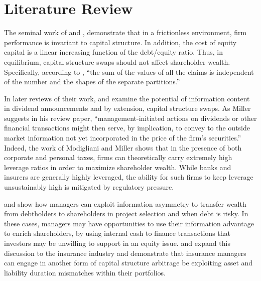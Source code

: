 \section{Literature Review}\label{sec:lit}

The seminal work of \citet{modigliani1958a} and \citet{modigliani1963a}, demonstrate that in a frictionless environment, firm performance is invariant to capital structure.  In addition, the cost of equity capital is a linear increasing function of the debt/equity ratio.  Thus, in equilibrium, capital structure swaps should not affect shareholder wealth. Specifically, according to \citet{miller1988a}, ``the sum of the values of all the claims is independent of the number and the shapes of the separate partitions.''

In later reviews of their work, \citet{miller1988a} and \citet{modigliani1988a} examine the potential of information content in dividend announcements and by extension, capital structure swaps.   As Miller suggests in his review paper, ``management-initiated actions on dividends or other financial transactions might then serve, by implication, to convey to the outside market information not yet incorporated in the price of the firm's securities.'' Indeed, the work of Modigliani and Miller shows that in the presence of both corporate and personal taxes, firms can theoretically carry extremely high leverage ratios in order to maximize shareholder wealth.  While banks and insurers are generally highly leveraged, the ability for such firms to keep leverage unsustainably high is mitigated by regulatory pressure.

\citet{rendleman1980a} and \citet{myers1984a} show how managers can exploit information asymmetry to transfer wealth from debtholders to shareholders in project selection and when debt is risky. In these cases, managers may have opportunities to use their information advantage to enrich shareholders, by using internal cash to finance transactions that investors may be unwilling to support in an equity issue.   \citet{staking1995a} and \citet{staking1997a} expand this discussion to the insurance industry and demonstrate that insurance managers can engage in another form of capital structure arbitrage be exploiting asset and liability duration mismatches within their portfolios.  

